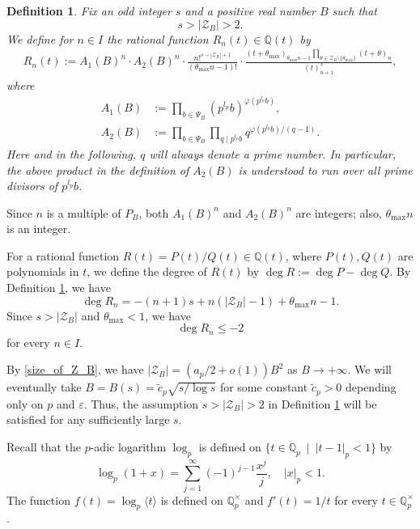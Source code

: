 \documentclass[12pt]{article}
\newtheorem{definition}[theorem]{Definition}
\numberwithin{equation}{section}
\begin{document}
\begin{definition}\label{definition_Rn(t)}
    Fix an odd integer $s$ and a positive real number $B$ such that 
    \[s > |\mathcal{Z}_B| > 2.\] 
    We define for $n\in I$ the rational function $R_n(t)\in \mathbb{Q}(t)$ by
        \begin{align*}
            R_n(t) :=  A_1(B)^n \cdot A_2(B)^n \cdot \frac{n!^{s-|\mathcal{Z}_B|+1}}{(\theta_{\max}n-1)!} \cdot \frac{ \left(t+\theta_{\max} \right)_{\theta_{\max}n-1}\prod_{\theta \in \mathcal{Z}_B\setminus\{\theta_{\max}\}}(t+\theta)_{n}}{(t)_{n+1}^{s}},
        \end{align*}
    where
	\begin{align*}
            A_{1}(B) &:= \prod_{b \in \Psi_B} \left( p^{l_p}b \right)^{\varphi\left(p^{l_p}b\right)}, \\
            A_2(B) &:= \prod_{b \in \Psi_B}\prod_{q \mid p^{l_p}b} q^{\varphi\left(p^{l_p}b\right)/(q-1)}.
	\end{align*}
Here and in the following, $q$ will always denote a prime number. In particular, the above product in the definition of $A_2(B)$ is understood to run over all prime divisors of $p^{l_p}b$.
\end{definition}
Since $n$ is a multiple of $P_B$, both $A_1(B)^n$ and $A_2(B)^n$ are integers; also, $\theta_{\max}n$ is an integer.


\bigskip

For a rational function $R(t)=P(t)/Q(t)\in \mathbb{Q}(t)$, where $P(t),Q(t)$ are polynomials in $t$, we define the degree of $R(t)$ by $\deg R:= \deg P - \deg Q$. By Definition \ref{definition_Rn(t)}, we have
\[\deg R_n = -(n+1)s+n(|\mathcal{Z}_B|-1)+\theta_{\max}n-1. \]
Since $s > |\mathcal{Z}_B|$ and $\theta_{\max} < 1$, we have
\[ \deg R_n \leqslant -2  \]
for every $n \in I$.

By \eqref{size_of_Z_B}, we have $|\mathcal{Z}_B| = (a_p/2 +o(1))B^2$ as $B \to +\infty$. We will eventually take $B = B(s) = \widetilde{c}_p\sqrt{s/\log s}$ for some constant $\widetilde{c}_p >0$ depending only on $p$ and $\varepsilon$. Thus, the assumption $s > |\mathcal{Z}_B| > 2$ in Definition \ref{definition_Rn(t)} will be satisfied for any sufficiently large $s$.

Recall that the $p$-adic logarithm $\log_p$ is defined on $\{ t \in \mathbb{Q}_p ~\mid~ |t-1|_p < 1 \}$ by
\[ \log_p(1+x) = \sum_{j=1}^{\infty} (-1)^{j-1}\frac{x^j}{j}, \quad |x|_p < 1. \]
The function $f(t) = \log_p\langle t \rangle$ is defined on $\mathbb{Q}_p^{\times}$ and $f'(t) = 1/t$ for every $t \in \mathbb{Q}_p^{\times}$.
\end{document}
